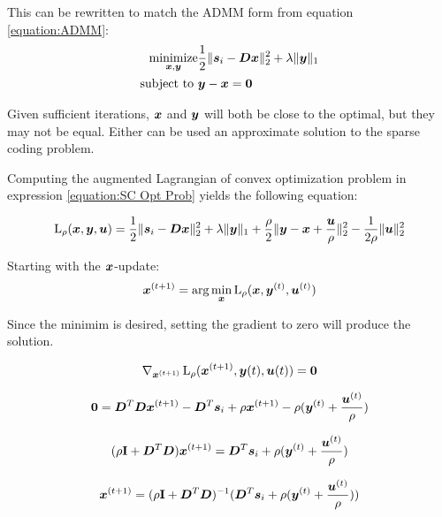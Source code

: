 This can be rewritten to match the ADMM form from equation \ref{equation:ADMM}:
\begin{equation} \label{equation:SC Opt Prob}
\begin{aligned}
\operatorname*{\text{minimize}}_{\bm{x},\bm{y}} & \frac{1}{2} \|\bm{s}_i - \bm{D}\bm{x}\|_2^2 + \lambda\|\bm{y}\|_1 \\
         \text{subject to } & \bm{y} - \bm{x} = \bm{0}
\end{aligned}
\end{equation}

Given sufficient iterations, $\bm{x}$ and $\bm{y}$ will both be close to the optimal, but they may not be equal. Either can be used an approximate solution to the sparse coding problem.

Computing the augmented Lagrangian of convex optimization problem in expression \ref{equation:SC Opt Prob} yields the following equation:

\begin{equation}
\operatorname{L}_{\rho}(\bm{x},\bm{y},\bm{u}) = \frac{1}{2} \|\bm{s}_i - \bm{D}\bm{x}\|_2^2 + \lambda\|\bm{y}\|_1 + \frac{\rho}{2}\|\bm{y} - \bm{x} + \frac{\bm{u}}{\rho}\|_2^2 - \frac{1}{2\rho}\|\bm{u}\|_2^2
\end{equation}

Starting with the $\bm{x}$-update:
\begin{equation}
\bm{x}^{(t + 1)} = \arg\min_{\bm{x}} \operatorname{L}_{\rho}(\bm{x},\bm{y}^{(t)},\bm{u}^{(t)})
\end{equation}

Since the minimim is desired, setting the gradient to zero will produce the solution.

\begin{equation}
\nabla_{\bm{x}^{(t + 1)}} \operatorname{L}_{\rho}(\bm{x}^{(t + 1)},\bm{y}{(t)},\bm{u}{(t)}) = \bm{0}
\end{equation}

\begin{equation}
\bm{0} = \bm{D}^T\bm{D}\bm{x}^{(t + 1)} - \bm{D}^T\bm{s}_i + \rho\bm{x}^{(t + 1)} - \rho(\bm{y}^{(t)} + \frac{\bm{u}^{(t)}}{\rho})
\end{equation}

\begin{equation}
(\rho{\bf I} + \bm{D}^T\bm{D})\bm{x}^{(t + 1)} = \bm{D}^T\bm{s}_i + \rho(\bm{y}^{(t)} + \frac{\bm{u}^{(t)}}{\rho})
\end{equation}

\begin{equation}
\bm{x}^{(t + 1)} = (\rho{\bf I} + \bm{D}^T\bm{D})^{-1}(\bm{D}^T\bm{s}_i + \rho(\bm{y}^{(t)} + \frac{\bm{u}^{(t)}}{\rho}))
\end{equation}

